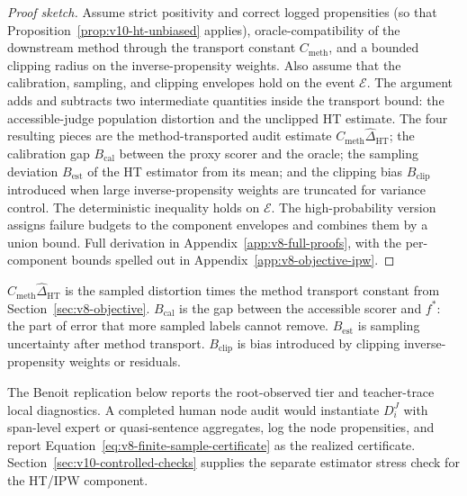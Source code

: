 \begin{proof}[Proof sketch]
Assume strict positivity and correct logged propensities (so that
Proposition~\ref{prop:v10-ht-unbiased} applies),
oracle-compatibility of the downstream method through the transport
constant \(C_{\mathrm{meth}}\), and a bounded clipping radius on
the inverse-propensity weights. Also assume that the calibration,
sampling, and clipping envelopes hold on the event \(\mathcal E\).
The argument adds and subtracts two intermediate quantities inside
the transport bound: the accessible-judge population distortion and
the unclipped HT estimate. The four resulting pieces are the
method-transported audit estimate
\(C_{\mathrm{meth}}\widehat\Delta_{\mathrm{HT}}\); the calibration
gap \(B_{\mathrm{cal}}\) between the proxy scorer and the oracle;
the sampling deviation \(B_{\mathrm{est}}\) of the HT estimator from
its mean; and the clipping bias \(B_{\mathrm{clip}}\) introduced
when large inverse-propensity weights are truncated for variance
control. The deterministic inequality holds on \(\mathcal E\). The
high-probability version assigns failure budgets to the component
envelopes and combines them by a union bound. Full derivation in
Appendix~\ref{app:v8-full-proofs}, with the per-component bounds
spelled out in Appendix~\ref{app:v8-objective-ipw}.
\end{proof}

\(C_{\mathrm{meth}}\widehat{\Delta}_{\mathrm{HT}}\) is the sampled
distortion times the method transport constant from
Section~\ref{sec:v8-objective}. \(B_{\mathrm{cal}}\) is the gap
between the accessible scorer and \(f^\ast\): the part of error that
more sampled labels cannot remove. \(B_{\mathrm{est}}\) is sampling
uncertainty after method transport. \(B_{\mathrm{clip}}\) is bias
introduced by clipping inverse-propensity weights or residuals.

The Benoit replication below reports the root-observed tier and
teacher-trace local diagnostics. A completed human node audit would
instantiate \(D_i^J\) with span-level expert or quasi-sentence
aggregates, log the node propensities, and report
Equation~\eqref{eq:v8-finite-sample-certificate} as the realized
certificate. Section~\ref{sec:v10-controlled-checks} supplies the
separate estimator stress check for the HT/IPW component.
